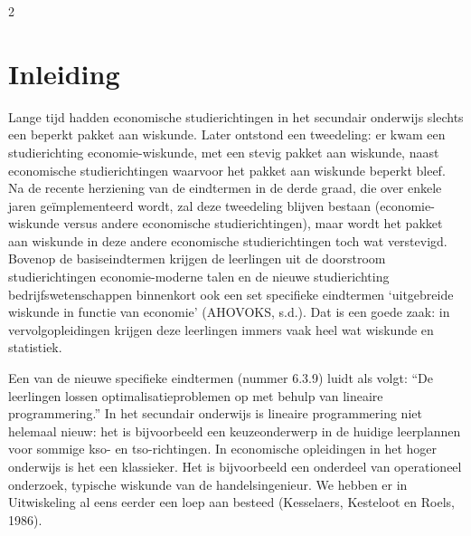 \renewcommand{\typeRubriek}{loep}		

\vspace{1.5cm}

\startcontents[mainsections]		%



\begin{multicols}{2}
	
	\inhoudstafelLoep		            %
	
	

	
\section{Inleiding}
	
    Lange tijd hadden economische studierichtingen in het secundair onderwijs slechts een beperkt pakket aan wiskunde. Later ontstond een tweedeling: er kwam een studierichting economie-wiskunde, met een stevig pakket aan wiskunde, naast economische studierichtingen waarvoor het pakket aan wiskunde beperkt bleef. Na de recente herziening van de eindtermen in de derde graad, die over enkele jaren geïmplementeerd wordt, zal deze tweedeling blijven bestaan (economie-wiskunde versus andere economische studierichtingen), maar wordt het pakket aan wiskunde in deze andere economische studierichtingen toch wat verstevigd. Bovenop de basiseindtermen krijgen de leerlingen uit de doorstroom studierichtingen economie-moderne talen en de nieuwe studierichting bedrijfswetenschappen binnenkort ook een set specifieke eindtermen ‘uitgebreide wiskunde in functie van economie’ (AHOVOKS, s.d.). Dat is een goede zaak: in vervolgopleidingen krijgen deze leerlingen immers vaak heel wat wiskunde en statistiek.
	
    Een van de nieuwe specifieke eindtermen (nummer 6.3.9) luidt als volgt: “De leerlingen lossen optimalisatieproblemen op met behulp van lineaire programmering.” In het secundair onderwijs is lineaire programmering niet helemaal nieuw: het is bijvoorbeeld een keuzeonderwerp in de huidige leerplannen voor sommige kso- en tso-richtingen. In economische opleidingen in het hoger onderwijs is het een klassieker. Het is bijvoorbeeld een onderdeel van operationeel onderzoek, typische wiskunde van de handelsingenieur. We hebben er in Uitwiskeling al eens eerder een loep aan besteed (Kesselaers, Kesteloot en Roels, 1986).
    

\end{multicols}
